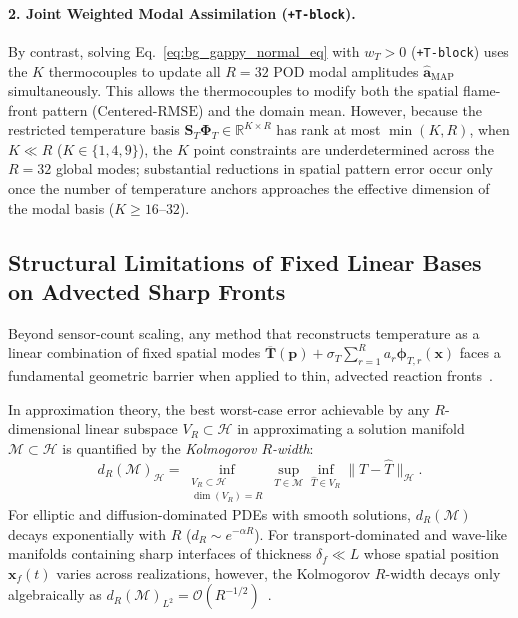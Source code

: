 \paragraph{2. Joint Weighted Modal Assimilation (\texttt{+T-block}).}
By contrast, solving Eq.~\eqref{eq:bg_gappy_normal_eq} with $w_T > 0$ (\texttt{+T-block}) uses the $K$ thermocouples to update all $R = 32$ POD modal amplitudes $\hat{\mathbf{a}}_{\text{MAP}}$ simultaneously. This allows the thermocouples to modify both the spatial flame-front pattern ($\text{Centered-RMSE}$) and the domain mean. However, because the restricted temperature basis $\mathbf{S}_T \boldsymbol{\Phi}_T \in \mathbb{R}^{K \times R}$ has rank at most $\min(K, R)$, when $K \ll R$ ($K \in \{1, 4, 9\}$), the $K$ point constraints are underdetermined across the $R=32$ global modes; substantial reductions in spatial pattern error occur only once the number of temperature anchors approaches the effective dimension of the modal basis ($K \ge 16\text{--}32$).

\subsection{Structural Limitations of Fixed Linear Bases on Advected Sharp Fronts}
\label{subsec:bg_kolmogorov}

Beyond sensor-count scaling, any method that reconstructs temperature as a linear combination of fixed spatial modes $\overline{\mathbf{T}}(\mathbf{p}) + \sigma_T \sum_{r=1}^R a_r \boldsymbol{\phi}_{T,r}(\mathbf{x})$ faces a fundamental geometric barrier when applied to thin, advected reaction fronts~\cite{ravela2007field, peherstorfer2018survey, greif2019decay}.

In approximation theory, the best worst-case error achievable by any $R$-dimensional linear subspace $V_R \subset \mathcal{H}$ in approximating a solution manifold $\mathcal{M} \subset \mathcal{H}$ is quantified by the \emph{Kolmogorov $R$-width}:
\begin{equation}
    d_R(\mathcal{M})_{\mathcal{H}} = \inf_{\substack{V_R \subset \mathcal{H} \\ \dim(V_R) = R}} \sup_{T \in \mathcal{M}} \inf_{\hat{T} \in V_R} \|T - \hat{T}\|_{\mathcal{H}}.
    \label{eq:bg_kolmogorov_width}
\end{equation}
For elliptic and diffusion-dominated PDEs with smooth solutions, $d_R(\mathcal{M})$ decays exponentially with $R$ ($d_R \sim e^{-\alpha R}$). For transport-dominated and wave-like manifolds containing sharp interfaces of thickness $\delta_f \ll L$ whose spatial position $\mathbf{x}_f(t)$ varies across realizations, however, the Kolmogorov $R$-width decays only algebraically as $d_R(\mathcal{M})_{L^2} = \mathcal{O}(R^{-1/2})$~\cite{peherstorfer2018survey, greif2019decay}.

